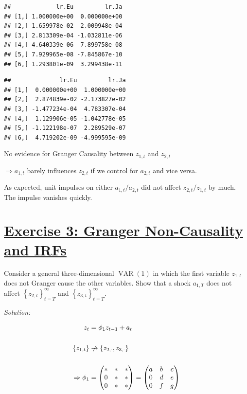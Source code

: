\documentclass[12pt,a4paper]{article}
\newcommand{\VAR}{\operatorname{VAR}} %
\newcommand{\tmpsection}[1]{}
\let\tmpsection=\section
\renewcommand{\section}[1]{\tmpsection{\underline{#1}} }
\newenvironment{Shaded}{\begin{snugshade}}{\end{snugshade}}
\newcommand{\NormalTok}[1]{#1}
\newcommand{\OperatorTok}[1]{\textcolor[rgb]{0.81,0.36,0.00}{\textbf{#1}}}
\begin{document}
\begin{verbatim}
##             lr.Eu         lr.Ja
## [1,] 1.000000e+00  0.000000e+00
## [2,] 1.659978e-02  2.009948e-04
## [3,] 2.813309e-04 -1.032811e-06
## [4,] 4.640339e-06  7.899758e-08
## [5,] 7.929965e-08 -7.845867e-10
## [6,] 1.293801e-09  3.299438e-11
\end{verbatim}

\begin{Shaded}
\end{Shaded}

\begin{verbatim}
##              lr.Eu         lr.Ja
## [1,]  0.000000e+00  1.000000e+00
## [2,]  2.874839e-02 -2.173827e-02
## [3,] -1.477234e-04  4.783307e-04
## [4,]  1.129906e-05 -1.042778e-05
## [5,] -1.122198e-07  2.289529e-07
## [6,]  4.719202e-09 -4.999595e-09
\end{verbatim}

No evidence for Granger Causality between \(z_{1, t}\) and \(z_{2, t}\)

\(\Rightarrow a_{1,t}\) barely influences \(z_{2, t}\) if we control for
\(a_{2, t}\) and vice versa.

As expected, unit impulses on either \(a_{1, t} / a_{2, t}\) did not
affect \(z_{2, t}/ z_{1, t}\) by much. The impulse vanishes quickly.

\hypertarget{exercise-3-granger-non-causality-and-irfs}{%
\section{Exercise 3: Granger Non-Causality and
IRFs}\label{exercise-3-granger-non-causality-and-irfs}}

Consider a general three-dimensional \(\VAR(1)\) in which the first
variable \(z_{1, t}\) does not Granger cause the other variables. Show
that a shock \(a_{1,T}\) does not affect
\(\left\{ z_{2, t}\right\}_{t = T}^{\infty}\) and
\(\left\{ z_{3, t}\right\}_{t = T}^{\infty}\).

\emph{Solution:}

\begin{align*}
  z_t & = \phi_1 z_{t-1} + a_t \\
  \\
  \{z_{1, t}\} & \centernot{\rightarrow} \left\{ z_{2, \cdot}, z_{3, \cdot}\right\}\\
  \\
  \Rightarrow \phi_1 & = \begin{pmatrix} 
  \ast & \ast & \ast \\
  0 & \ast & \ast \\
  0 & \ast & \ast \\
  \end{pmatrix} =  \begin{pmatrix} 
  a & b & c \\
  0 & d & e \\
  0 & f & g \\
  \end{pmatrix}
\end{align*}
\end{document}
